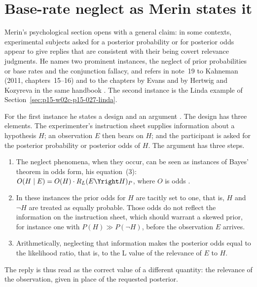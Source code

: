 \section{Base-rate neglect as Merin states it}
\label{sec:p15-w02c-p15-027-base-rate}

Merin's psychological section opens with a general claim: in some
contexts, experimental subjects asked for a posterior probability or for
posterior odds appear to give replies that are consistent with their
being covert relevance judgments. He names two prominent instances, the
neglect of prior probabilities or base rates and the conjunction
fallacy, and refers in note~19 to Kahneman (2011, chapters~15--16) and to
the chapters by Evans and by Hertwig and Kozyreva in the same handbook
\cite[p.~273 and p.~274, n.~19]{Merin2021Relevance}. The second instance
is the Linda example of Section~\ref{sec:p15-w02c-p15-027-linda}.

For the first instance he states a design and an argument
\cite[p.~273]{Merin2021Relevance}. The design has three elements. The
experimenter's instruction sheet supplies information about a hypothesis
\(H\); an observation \(E\) then bears on \(H\); and the participant is
asked for the posterior probability or posterior odds of \(H\). The
argument has three steps.
\begin{enumerate}
\item The neglect phenomena, when they occur, can be seen as instances of
  Bayes' theorem in odds form, his equation~(3):
  \(O(H\mid E)=O(H)\cdot R_L(E\Yright H)_P\), where \(O\) is odds
  \cite[p.~270 and p.~274, n.~10]{Merin2021Relevance}.
\item In these instances the prior odds for \(H\) are tacitly set to one,
  that is, \(H\) and \(\neg H\) are treated as equally probable. Those
  odds do not reflect the information on the instruction sheet, which
  should warrant a skewed prior, for instance one with
  \(P(H)\gg P(\neg H)\), before the observation \(E\) arrives.
\item Arithmetically, neglecting that information makes the posterior
  odds equal to the likelihood ratio, that is, to the L value of the
  relevance of \(E\) to \(H\).
\end{enumerate}
The reply is thus read as the correct value of a different quantity: the
relevance of the observation, given in place of the requested posterior.

